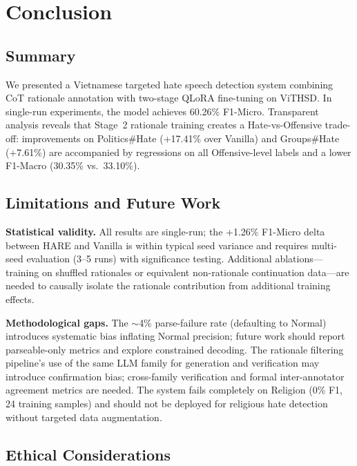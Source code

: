 \documentclass[conference]{IEEEtran}
\begin{document}
\section{Conclusion}\label{sec:conclusion}

\subsection{Summary}

We presented a Vietnamese targeted hate speech detection system combining CoT
rationale annotation with two-stage QLoRA fine-tuning on ViTHSD. In single-run
experiments, the model achieves 60.26\% F1-Micro. Transparent analysis reveals
that Stage~2 rationale training creates a Hate-vs-Offensive trade-off:
improvements on Politics\#Hate (+17.41\% over Vanilla) and Groups\#Hate
(+7.61\%) are accompanied by regressions on all Offensive-level labels and a
lower F1-Macro (30.35\% vs.\ 33.10\%).

\subsection{Limitations and Future Work}

\textbf{Statistical validity.} All results are single-run; the +1.26\%
F1-Micro delta between HARE and Vanilla is within typical seed variance and
requires multi-seed evaluation (3--5 runs) with significance testing.
Additional ablations---training on shuffled rationales or equivalent non-rationale
continuation data---are needed to causally isolate the rationale contribution
from additional training effects.

\textbf{Methodological gaps.} The ${\sim}$4\% parse-failure rate (defaulting to
Normal) introduces systematic bias inflating Normal precision; future work should
report parseable-only metrics and explore constrained decoding. The rationale
filtering pipeline's use of the same LLM family for generation and verification
may introduce confirmation bias; cross-family verification and formal
inter-annotator agreement metrics are needed. The system fails completely on
Religion (0\% F1, 24 training samples) and should not be deployed for religious
hate detection without targeted data augmentation.

\subsection{Ethical Considerations}
\end{document}
